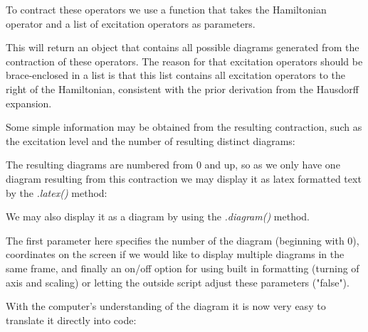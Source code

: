 To contract these operators we use a function that takes the Hamiltonian operator and a list of excitation operators as parameters. 

\begin{minipage}{\linewidth}
\end{minipage}

This will return an object that contains all possible diagrams generated from the contraction of these operators. The reason for that excitation operators should be brace-enclosed in a list is that this list contains all excitation operators to the right of the Hamiltonian, consistent with the prior derivation from the Hausdorff expansion.

Some simple information may be obtained from the resulting contraction, such as the excitation level and the number of resulting distinct diagrams:

\begin{minipage}{\linewidth}
\end{minipage}

The resulting diagrams are numbered from 0 and up, so as we only have one diagram resulting from this contraction we may display it as latex formatted text by the \emph{.latex()} method:

\begin{minipage}{\linewidth}
\end{minipage}

We may also display it as a diagram by using the \emph{.diagram()} method.

\begin{minipage}{\linewidth}
\end{minipage}

The first parameter here specifies the number of the diagram (beginning with 0), coordinates on the screen if we would like to display multiple diagrams in the same frame, and finally an on/off option for using built in formatting (turning of axis and scaling) or letting the outside script adjust these parameters ("false").

With the computer's understanding of the diagram it is now very easy to translate it directly into code:

\begin{minipage}{\linewidth}
\end{minipage}

